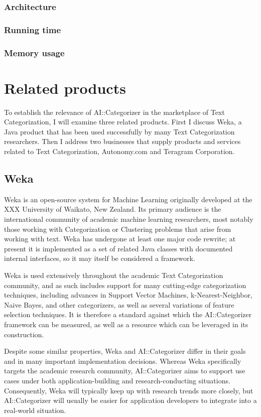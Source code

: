 \documentclass[a4paper]{report}
\begin{document}
\subsubsection{Architecture}
\subsubsection{Running time}
\subsubsection{Memory usage}

\section{Related products}

To establish the relevance of AI::Categorizer in the marketplace of
Text Categorization, I will examine three related products.  First I
discuss Weka, a Java product that has been used successfully by many
Text Categorization researchers.  Then I address two businesses that
supply products and services related to Text Categorization,
Autonomy.com and Teragram Corporation.

\subsection{Weka}

Weka is an open-source system for Machine Learning originally
developed at the XXX University of Waikato, New Zealand.  Its primary
audience is the international community of academic machine learning
researchers, most notably those working with Categorization or
Clustering problems that arise from working with text.  Weka has
undergone at least one major code rewrite; at present it is
implemented as a set of related Java classes with documented internal
interfaces, so it may itself be considered a framework.

Weka is used extensively throughout the academic Text Categorization
community, and as such includes support for many cutting-edge
categorization techniques, including advances in Support Vector
Machines, k-Nearest-Neighbor, Naive Bayes, and other categorizers, as
well as several variations of feature selection techniques.  It is
therefore a standard against which the AI::Categorizer framework can
be measured, as well as a resource which can be leveraged in its
construction.

Despite some similar properties, Weka and AI::Categorizer differ in
their goals and in many important implementation decisions.  Whereas
Weka specifically targets the academic research community,
AI::Categorizer aims to support use cases under both
application-building and research-conducting situations.
Consequently, Weka will typically keep up with research trends more
closely, but AI::Categorizer will usually be easier for application
developers to integrate into a real-world situation.
\end{document}
